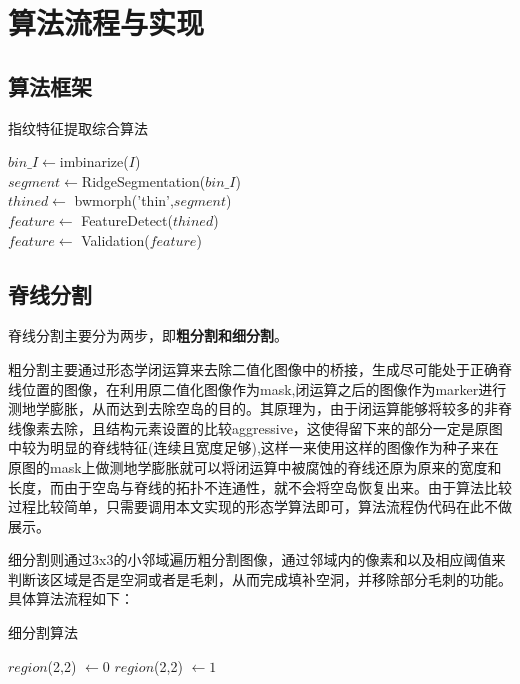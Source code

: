 \documentclass[UTF8]{ctexart}
\begin{document}
\section{算法流程与实现}

\subsection{算法框架}
\begin{algorithm}[H]
    \caption{指纹特征提取综合算法}
    {
        $ bin\_I \leftarrow $imbinarize($I$)\\
        $ segment \leftarrow $RidgeSegmentation($bin\_I$)\\
        $thined \leftarrow$ bwmorph('thin',$segment$)\\
        $feature \leftarrow$ FeatureDetect($thined$)\\
        $feature \leftarrow$ Validation($feature$)
    }
\end{algorithm}


\subsection{脊线分割}
脊线分割主要分为两步，即\textbf{粗分割和细分割}。

粗分割主要通过形态学闭运算来去除二值化图像中的桥接，生成尽可能处于正确脊线位置的图像，在利用原二值化图像作为mask,闭运算之后的图像作为marker进行测地学膨胀，从而达到去除空岛的目的。其原理为，由于闭运算能够将较多的非脊线像素去除，且结构元素设置的比较aggressive，这使得留下来的部分一定是原图中较为明显的脊线特征(连续且宽度足够),这样一来使用这样的图像作为种子来在原图的mask上做测地学膨胀就可以将闭运算中被腐蚀的脊线还原为原来的宽度和长度，而由于空岛与脊线的拓扑不连通性，就不会将空岛恢复出来。由于算法比较过程比较简单，只需要调用本文实现的形态学算法即可，算法流程伪代码在此不做展示。

细分割则通过3x3的小邻域遍历粗分割图像，通过邻域内的像素和以及相应阈值来判断该区域是否是空洞或者是毛刺，从而完成填补空洞，并移除部分毛刺的功能。具体算法流程如下：

\begin{algorithm}[H]
    \caption{细分割算法}
    {
        {
            {
                $region$(2,2) $\leftarrow 0$ 
            }
        }
        {
            {
                $region$(2,2) $\leftarrow 1$ 
            }
        }
    }
\end{algorithm}
\end{document}
